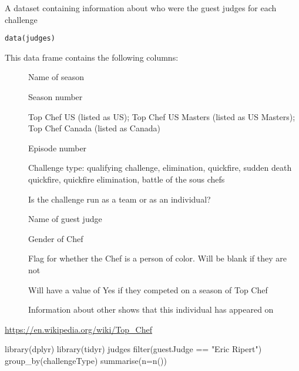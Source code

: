 \documentclass[a4paper]{book}
\begin{document}
%
\begin{Description}
A dataset containing information about who were the guest judges for
each challenge
\end{Description}
%
\begin{Usage}
\begin{verbatim}
data(judges)
\end{verbatim}
\end{Usage}
%
\begin{Format}
This data frame contains the following columns:
\begin{description}

\item[] Name of season
\item[] Season number
\item[] Top Chef US (listed as US); Top Chef US Masters
(listed as US Masters); Top Chef Canada (listed as Canada)
\item[] Episode number
\item[] Challenge type: qualifying challenge,
elimination, quickfire, sudden death quickfire, quickfire
elimination, battle of the sous chefs
\item[] Is the challenge run as a team or as an
individual?
\item[] Name of guest judge
\item[] Gender of Chef
\item[] Flag for whether the Chef is a person of color.
Will be blank if they are not
\item[] Will have a value of Yes if they competed
on a season of Top Chef
\item[] Information about other shows that this
individual has appeared on

\end{description}

\end{Format}
%
\begin{Source}
\url{https://en.wikipedia.org/wiki/Top_Chef}
\end{Source}
%
\begin{Examples}
\begin{ExampleCode}
library(dplyr)
library(tidyr)
judges %
  filter(guestJudge == "Eric Ripert") %
  group_by(challengeType) %
  summarise(n=n())
\end{ExampleCode}
\end{Examples}
\end{document}
